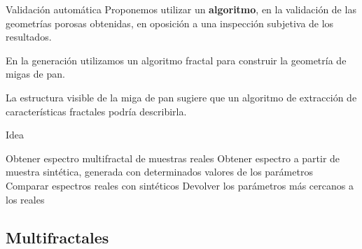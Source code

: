 \documentclass[spanish]{beamer}
\begin{document}
\begin{frame}{Validación automática}
Proponemos utilizar un \textbf{algoritmo}, en la validación de las geometrías porosas obtenidas, en oposición a una inspección subjetiva de los resultados.

En la generación utilizamos un algoritmo fractal para construir la geometría de migas de pan.

La estructura visible de la miga de pan sugiere que un algoritmo de extracción de características fractales podría describirla.


\end{frame}

\begin{frame}{Idea}
\begin{algorithm}[H]
\begin{algorithmic}[1]
\STATE Obtener espectro multifractal de muestras reales
\STATE Obtener espectro a partir de muestra sintética, generada con determinados valores de los parámetros
\STATE Comparar espectros reales con sintéticos
\ENDFOR
\STATE Devolver los parámetros más cercanos a los reales
\end{algorithmic}
\end{algorithm}
\end{frame}


\subsection{Multifractales}




\end{document}
